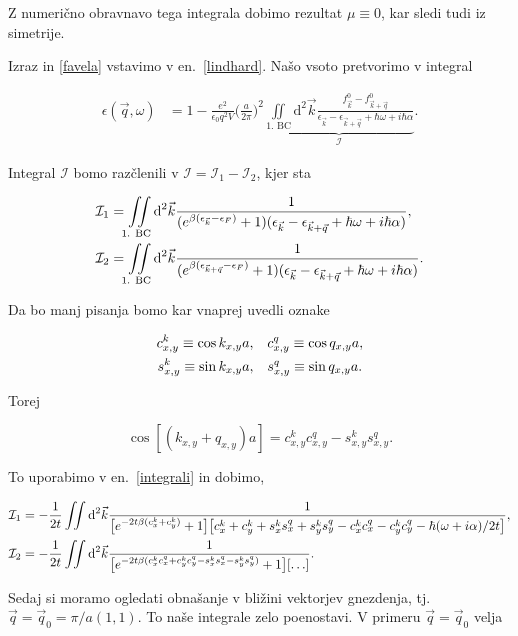 \documentclass[a4paper, 12pt]{article}
\newcommand{\vq}{
	\ensuremath{\vec{q}}
}
\newcommand{\w}{
	\ensuremath{\omega}
}
\newcommand{\e}{
	\ensuremath{\epsilon}
}
\newcommand{\vk}{
	\ensuremath{\vec{k}}
}
\renewcommand{\ni}{
	\noindent
}
\newcommand{\pred}{
	\ensuremath{\frac{e^2}{\e_0 q^2 V}}
}
\newcommand{\dd}{
	\ensuremath{\text{d}}
}
\newcommand{\I}{
	\ensuremath{\mathcal{I}}
}
\begin{document}
Z numeri\v cno obravnavo tega integrala dobimo rezultat $\mu \equiv 0$, kar sledi tudi iz
simetrije.

\ni Izraz in \eqref{favela} vstavimo v en.~\eqref{lindhard}. Na\v so vsoto pretvorimo
v integral

\begin{align}
	\e(\vq, \w) &= 1 - \pred \Big(\frac{a}{2\pi}\Big)^2 \underbrace{ \iint\limits_\text{1. BC}\dd^2 \vk \frac{f^0_{\vk} -
		f^0_{\vk+\vq}}{\e_{\vk} - \e_{\vk+\vq} + \hbar\w + i\hbar\alpha}}_{\I}.
\end{align}

\ni Integral $\I$ bomo raz\v clenili v $\I = \I_1 - \I_2$, kjer sta

\begin{align}
	\I_1 &= \iint\limits_\text{1. BC}\dd^2 \vk \frac{1}{(e^{\beta(\e_{\vk} - \e_F)} + 1)
		(\e_{\vk} - \e_{\vk + \vq} + \hbar\w + i\hbar\alpha)}, \notag \\
	\I_2 &= \iint\limits_\text{1. BC}\dd^2 \vk \frac{1}{(e^{\beta(\e_{\vk+\vq} - \e_F)} + 1)
		(\e_{\vk} - \e_{\vk + \vq} + \hbar\w + i\hbar\alpha)}.
	\label{integrali}
\end{align}

\ni Da bo manj pisanja bomo kar vnaprej uvedli oznake

\begin{align}
	c_{x,y}^k \equiv \cos k_{x,y} a, &\quad	c_{x,y}^q \equiv \cos q_{x,y} a, \notag \\
	s_{x,y}^k \equiv \sin k_{x,y} a, &\quad s_{x,y}^q \equiv \sin q_{x,y} a.
\end{align}

\ni Torej

\begin{equation}
	\cos [(k_{x,y} + q_{x,y}) a] = c_{x,y}^k c_{x,y}^q - s_{x,y}^k s_{x,y}^q.
\end{equation}

\ni To uporabimo v en.~\eqref{integrali} in dobimo, 

\begin{align}
	\I_1 &= -\frac{1}{2t}\iint \dd^2 \vk \frac{1}
		{\big[e^{-2t\beta(c_x^k + c_y^k)} + 1\big]
		\big[c_x^k + c_y^k + s_x^k s_x^q + s_y^k s_y^q - c_x^k c_x^q - c_y^k c_y^q -
		\hbar(\w + i\alpha)/2t\big]}, \notag \\
	\I_2 &= -\frac{1}{2t}\iint \dd^2 \vk \frac{1}
		{\big[e^{-2t\beta (c_x^k c_x^q + c_y^k c_y^q - s_x^k s_x^q - s_y^k s_y^q)} + 1\big]
	[ \ldots ]}.
\end{align}

Sedaj si moramo ogledati obna\v sanje v bli\v zini vektorjev gnezdenja, tj. $\vq = \vq_0 =
\pi/a (1,1)$. To na\v se integrale zelo poenostavi. V primeru $\vq = \vq_0$ velja
\end{document}
